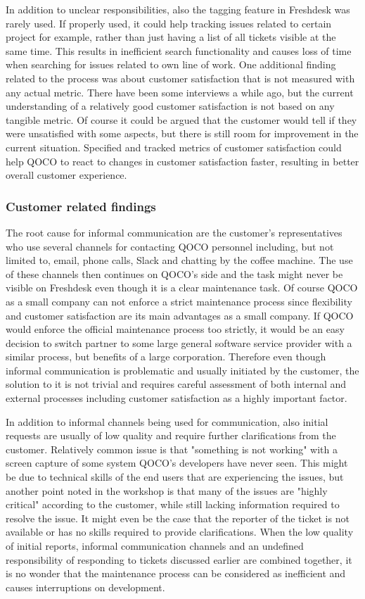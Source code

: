 In addition to unclear responsibilities, also the tagging feature in Freshdesk was rarely used. If properly used, it could help tracking issues related to certain project for example,
rather than just having a list of all tickets visible at the same time. This results in inefficient search functionality and causes loss of time when searching for issues related
to own line of work. One additional finding related to the process was about customer satisfaction that is not measured with any actual metric. There have been some interviews
a while ago, but the current understanding of a relatively good customer satisfaction is not based on any tangible metric. Of course it could be argued that the customer would
tell if they were unsatisfied with some aspects, but there is still room for improvement in the current situation. Specified and tracked metrics of customer satisfaction could
help QOCO to react to changes in customer satisfaction faster, resulting in better overall customer experience.

\subsubsection*{Customer related findings}

The root cause for informal communication are the customer's representatives who use several channels for contacting QOCO personnel including, but not limited to, email, phone calls,
Slack and chatting by the coffee machine. The use of these channels then continues on QOCO's side and the task might never be visible on Freshdesk even though it is a clear maintenance
task. Of course QOCO as a small company can not enforce a strict maintenance process since flexibility and customer satisfaction are its main advantages as a small company. If QOCO would
enforce the official maintenance process too strictly, it would be an easy decision to switch partner to some large general software service provider with a similar process, but benefits
of a large corporation. Therefore even though informal communication is problematic and usually initiated by the customer, the solution to it is not trivial and requires careful assessment
of both internal and external processes including customer satisfaction as a highly important factor.

In addition to informal channels being used for communication, also initial requests are usually of low quality and require further clarifications from the customer. Relatively common
issue is that "something is not working" with a screen capture of some system QOCO's developers have never seen. This might be due to technical skills of the end users that are
experiencing the issues, but another point noted in the workshop is that many of the issues are "highly critical" according to the customer, while still lacking information required to 
resolve the issue. It might even be the case that the reporter of the ticket is not available or has no skills required to provide clarifications. When the low quality of initial reports,
informal communication channels and an undefined responsibility of responding to tickets discussed earlier are combined together, it is no wonder that the maintenance process can be
considered as inefficient and causes interruptions on development.

